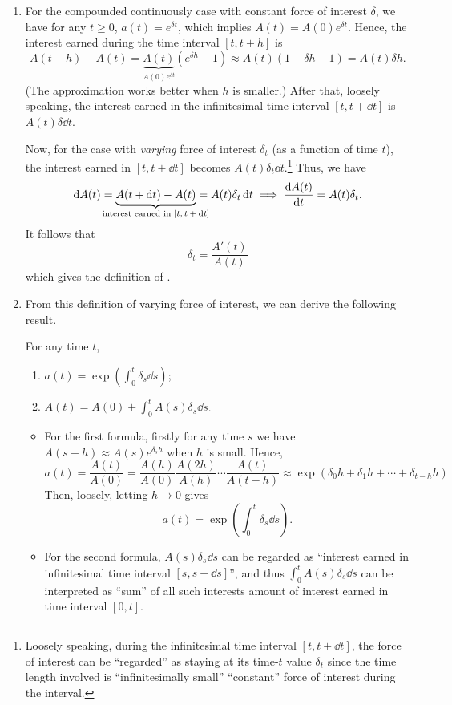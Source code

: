 \begin{enumerate}
\item \label{it:varying-foi-motivation}
For the compounded continuously case with constant force of interest
\(\delta\), we have for any \(t\ge 0\), \(a(t)=e^{\delta t}\), which implies
\(A(t)=A(0)e^{\delta t}\). Hence, the interest earned during the time interval
\([t, t+h]\) is
\[
A(t+h)-A(t)=\underbrace{A(t)}_{A(0)e^{\delta t}}(e^{\delta h}-1)
\approx A(t)(1+\delta h-1)=A(t)\delta h.
\]
(The approximation works better when \(h\) is smaller.)
After that, loosely speaking, the interest earned in the infinitesimal time
interval \([t,t+\dd{t}]\) is \(A(t)\delta\dd{t}\).

Now, for the case with \emph{varying} force of interest \(\delta_t\) (as a
function of time \(t\)), the interest earned in \([t,t+\dd{t}]\) becomes
\(A(t)\delta_t\dd{t}\).\footnote{Loosely speaking, during the infinitesimal time
interval \([t,t+\dd{t}]\), the force of interest can be ``regarded'' as staying at
its time-\(t\) value \(\delta_t\) since the time length involved is
``infinitesimally small''  ``constant'' force of interest
during the interval.} Thus, we have
\[
\dd{A(t)}=\underbrace{A(t+\dd{t})-A(t)}_{\mathclap{\text{interest earned in \([t,t+\dd{t}]\)}}}=A(t)\delta_t\dd{t}
\implies
\dv{A(t)}{t}=A(t)\delta_t.
\]
It follows that
\[
\delta_t=\frac{A'(t)}{A(t)}
\]
which gives the definition of .

\item From this definition of varying force of interest, we can derive the
following result.
\begin{proposition}
\label{prp:foi-fmlas}
For any time \(t\),
\begin{enumerate}
\item \(\displaystyle a(t)=\exp(\int_{0}^{t}\delta_s\dd{s})\);
\item \(\displaystyle A(t)=A(0)+\int_{0}^{t}A(s)\delta_s\dd{s}\).
\end{enumerate}
\end{proposition}
\begin{intuition}
\begin{itemize}
\item For the first formula, firstly for any time \(s\) we have \(A(s+h)\approx
A(s)e^{\delta_sh}\) when \(h\) is small. Hence,
\[
a(t)=\frac{A(t)}{A(0)}=\frac{A(h)}{A(0)}\frac{A(2h)}{A(h)}\dotsb\frac{A(t)}{A(t-h)}
\approx\exp(\delta_0h+\delta_1h+\dotsb+\delta_{t-h}h)
\]
Then, loosely, letting \(h\to 0\) gives
\[
a(t)=\exp(\int_{0}^{t}\delta_s\dd{s}).
\]
\item For the second formula, \(A(s)\delta_s\dd{s}\) can be regarded as
``interest earned in infinitesimal time interval \([s,s+\dd{s}]\)'', and thus
\(\displaystyle \int_{0}^{t}A(s)\delta_s\dd{s}\) can be interpreted as ``sum''
of all such interests  amount of interest earned in time
interval \([0,t]\).
\end{itemize}
\end{intuition}


\end{enumerate}
